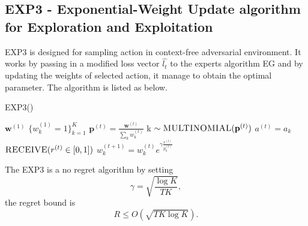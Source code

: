 \documentclass[11pt]{article}
\begin{document}
\subsection{EXP3 - Exponential-Weight Update algorithm for Exploration and Exploitation}
EXP3 is designed for sampling action in context-free adversarial environment. It works by passing in a modified loss vector $\hat{l_t}$ to the experts algorithm EG and by updating the weights of selected action, it manage to obtain the optimal parameter. The algorithm is listed as below.
\begin{algorithm}[H]
\caption{EXP3(\gamma \in [0, 1])}
\label{algo:exp3}
\begin{algorithmic}[1]
\STATE $\textbf{w}^{(1)}$ \leftarrow $\{w_k^{(1)} = 1 \}_{k=1}^K$ \quad {}
\STATE $\textbf{p}^{(t)} = \frac{\textbf{w}^{(t)}}{\sum_k w_k^{(t)}}$ \quad {}
\STATE k $\sim  \textsc{MULTINOMIAL}(\textbf{p}^{(t)})$ \quad {}
\STATE $a^{(t)} = a_k$ 
\STATE $\textsc{RECEIVE}(r^{(t)}\in[0, 1])$ \quad {}
\STATE $w_k^{(t+1)} = w_k^{(t)}e^{\gamma \frac{r^{(t)}}{p_k^{(t)}}}$ \quad {}
\ENDFOR
\end{algorithmic}
\end{algorithm}

The EXP3 is a no regret algorithm by setting
$$\gamma = \sqrt{\frac{\log K}{TK}},$$
the regret bound is
$$R \le O(\sqrt{TK \log K}).$$
\end{document}
